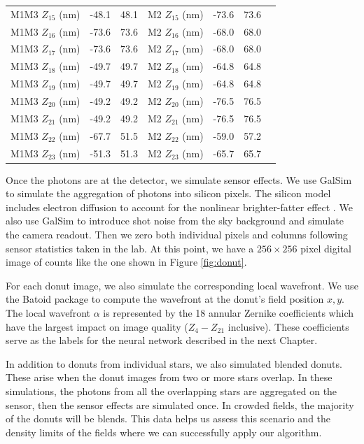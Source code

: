 \begin{table}[!htbp]
\begin{center}
\begin{tabular}{|l|c|c|l|c|c|r|}
M1M3 $Z_{15}$ \hfill (nm) & -48.1 & 48.1 & M2 $Z_{15}$ \hfill (nm) & -73.6 & 73.6 \\
M1M3 $Z_{16}$ \hfill (nm) & -73.6 & 73.6 & M2 $Z_{16}$ \hfill (nm) & -68.0 & 68.0 \\
M1M3 $Z_{17}$ \hfill (nm) & -73.6 & 73.6 & M2 $Z_{17}$ \hfill (nm) & -68.0 & 68.0 \\
M1M3 $Z_{18}$ \hfill (nm) & -49.7 & 49.7 & M2 $Z_{18}$ \hfill (nm) & -64.8 & 64.8 \\
M1M3 $Z_{19}$ \hfill (nm) & -49.7 & 49.7 & M2 $Z_{19}$ \hfill (nm) & -64.8 & 64.8 \\
M1M3 $Z_{20}$ \hfill (nm) & -49.2 & 49.2 & M2 $Z_{20}$ \hfill (nm) & -76.5 & 76.5 \\
M1M3 $Z_{21}$ \hfill (nm) & -49.2 & 49.2 & M2 $Z_{21}$ \hfill (nm) & -76.5 & 76.5 \\
M1M3 $Z_{22}$ \hfill (nm) & -67.7 & 51.5 & M2 $Z_{22}$ \hfill (nm) & -59.0 & 57.2 \\
M1M3 $Z_{23}$ \hfill (nm) & -51.3 & 51.3 & M2 $Z_{23}$ \hfill (nm) & -65.7 & 65.7 \\
\hline
\end{tabular}
\end{center}
\end{table} 

Once the photons are at the detector, we simulate sensor effects. We use GalSim to simulate the aggregation of photons into silicon pixels. The silicon model includes electron diffusion to account for the nonlinear brighter-fatter effect \cite{brighterfatter}. We also use GalSim to introduce shot noise from the sky background and simulate the camera readout. Then we zero both individual pixels and columns following sensor statistics taken in the lab. At this point, we have a $256 \times 256$ pixel digital image of counts like the one shown in Figure \ref{fig:donut}.

For each donut image, we also simulate the corresponding local wavefront. We use the Batoid package to compute the wavefront at the donut's field position $x,y$. The local wavefront $\alpha$ is represented by the 18 annular Zernike coefficients which have the largest impact on image quality ($Z_4 - Z_{21}$ inclusive). These coefficients serve as the labels for the neural network described in the next Chapter.

In addition to donuts from individual stars, we also simulated blended donuts. These arise when the donut images from two or more stars overlap. In these simulations, the photons from all the overlapping stars are aggregated on the sensor, then the sensor effects are simulated once. In crowded fields, the majority of the donuts will be blends. This data helps us assess this scenario and the density limits of the fields where we can successfully apply our algorithm. 


